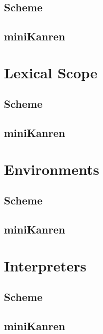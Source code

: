 \documentclass[11pt]{book}
\begin{document}
\begin{schemeregion}
\section{Scheme}
\section{miniKanren}

\chapter{Lexical Scope}
\section{Scheme}
\section{miniKanren}

\chapter{Environments}
\section{Scheme}
\section{miniKanren}

\chapter{Interpreters}
\section{Scheme}
\section{miniKanren}





\backmatter




%


\printindex %

\end{schemeregion}
\end{document}
